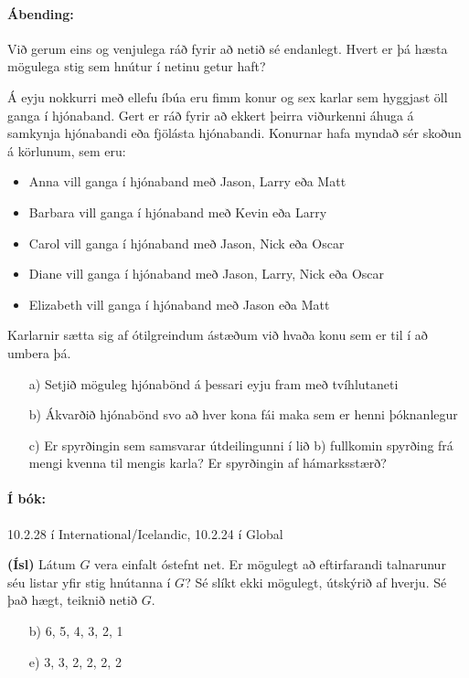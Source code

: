 \documentclass{article}
\begin{document}
\paragraph{Ábending:} Við gerum eins og venjulega ráð fyrir að netið sé endanlegt. Hvert er þá hæsta mögulega stig sem hnútur í netinu getur haft?

\question Á eyju nokkurri með ellefu íbúa eru fimm konur og sex karlar sem hyggjast öll ganga í hjónaband. Gert er ráð fyrir að ekkert þeirra viðurkenni áhuga á samkynja hjónabandi eða fjölásta hjónabandi. Konurnar hafa myndað sér skoðun á körlunum, sem eru:

\begin{itemize}
    \item Anna vill ganga í hjónaband með Jason, Larry eða Matt
    \item Barbara vill ganga í hjónaband með Kevin eða Larry
    \item Carol vill ganga í hjónaband með Jason, Nick eða Oscar
    \item Diane vill ganga í hjónaband með Jason, Larry, Nick eða Oscar
    \item Elizabeth vill ganga í hjónaband með Jason eða Matt
\end{itemize}

Karlarnir sætta sig af ótilgreindum ástæðum við hvaða konu sem er til í að umbera þá.
\begin{itemize}
    \item[a)] Setjið möguleg hjónabönd á þessari eyju fram með tvíhlutaneti
    \item[b)] Ákvarðið hjónabönd svo að hver kona fái maka sem er henni þóknanlegur
    \item[c)] Er spyrðingin sem samsvarar útdeilingunni í lið b) fullkomin spyrðing frá mengi kvenna til mengis karla? Er spyrðingin af hámarksstærð?
\end{itemize}

\paragraph{Í bók:} 10.2.28 í International/Icelandic, 10.2.24 í Global

\question 

\textbf{(Ísl)} Látum $G$ vera einfalt óstefnt net. Er mögulegt að eftirfarandi talnarunur séu listar yfir stig hnútanna í $G$? Sé slíkt ekki mögulegt, útskýrið af hverju. Sé það hægt, teiknið netið $G$.

\begin{itemize}
    \item[b)] 6, 5, 4, 3, 2, 1
    \item[e)] 3, 3, 2, 2, 2, 2
\end{itemize}
\end{document}
